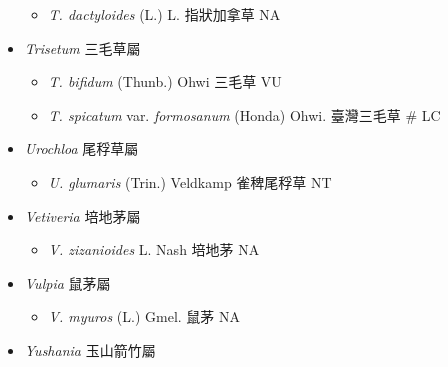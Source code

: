 \begin{itemize}
  \begin{itemize}
        \item[] \textit{T. dactyloides} (L.) L.  指狀加拿草   NA
  \end{itemize}
 \item[] \textit{Trisetum} 三毛草屬
                                
  \begin{itemize}
        \item[] \textit{T. bifidum} (Thunb.) Ohwi  三毛草   VU
        \item[] \textit{T. spicatum} var. \textit{formosanum} (Honda) Ohwi.  臺灣三毛草  \# LC
  \end{itemize}
 \item[] \textit{Urochloa} 尾稃草屬
                                
  \begin{itemize}
        \item[] \textit{U. glumaris} (Trin.) Veldkamp  雀稗尾稃草   NT
  \end{itemize}
 \item[] \textit{Vetiveria} 培地茅屬
                                
  \begin{itemize}
        \item[] \textit{V. zizanioides} L. Nash  培地茅   NA
  \end{itemize}
 \item[] \textit{Vulpia} 鼠茅屬
                                
  \begin{itemize}
        \item[] \textit{V. myuros} (L.) Gmel.  鼠茅   NA
  \end{itemize}
 \item[] \textit{Yushania} 玉山箭竹屬
                                

\end{itemize}
